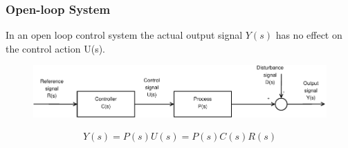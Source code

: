 \begin{frame}
	\frametitle{Open-loop System}
	\begin{definition}
		In an open loop control system the actual output signal $Y(s)$ has no effect on the control action U(s).
		\vspace{-1em}
		\begin{figure}
			\centering
			\includegraphics[width=1\linewidth]{Open-Loop}
			\label{fig:Open-Loop}
		\end{figure}
		\begin{align*}
		Y(s) = P(s)U(s) = P(s)C(s)R(s) \\
		\end{align*}
	\end{definition}
\end{frame}

